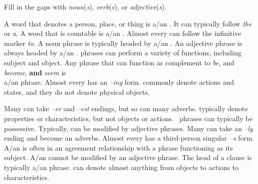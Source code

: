 \begin{tcolorbox}[title=Summary and review, colback=white]
    Fill in the gaps with \textit{noun}(\textit{s}), \textit{verb}(\textit{s}), or \textit{adjective}(\textit{s}).

    \phantom{a}

    \phantom{zzz}A word that denotes a person, place, or thing is a/an \uline{\hspace{1.5cm}}.
    \uline{\hspace{1.5cm}} It can typically follow \textit{the} or \textit{a}. A word that is countable is a/an \uline{\hspace{2cm}}.
    Almost every \uline{\hspace{2cm}} can follow the infinitive marker \textit{to}.
    A noun phrase is typically headed by a/an \uline{\hspace{2cm}}.
    An adjective phrase is always headed by a/an \uline{\hspace{2cm}}.
    \uline{\hspace{2cm}} phrases can perform a variety of functions, including subject and object. Any phrase that can function as complement to \textit{be}, and \textit{become}, \textbf{and} \textit{seem} is \\a/an \uline{\hspace{2cm}} phrase. Almost every \uline{\hspace{2cm}} has an \textit{--ing} form.
    \uline{\hspace{2cm}} commonly denote actions and states, and they do not denote physical objects.

    \phantom{zzz}Many \uline{\hspace{2cm}} can take \textit{--er} and \textit{--est} endings, but so can many adverbs.
    \uline{\hspace{2cm}} typically denote properties or characteristics, but not objects or actions.
    \uline{\hspace{1.4cm}}~phrases can typically be possessive. Typically,
    \uline{\hspace{2cm}} can be modified by adjective phrases. Many \uline{\hspace{2cm}} can take an \textit{--ly} ending and become an adverbs. Almost every \uline{\hspace{2cm}} has a third-person singular \textit{--s} form. A/an \uline{\hspace{2cm}} is often in an agreement relationship with a phrase functioning as its subject. A/an \uline{\hspace{2cm}} cannot be modified by an adjective phrase. The head of a clause is typically a/an \uline{\hspace{2cm}} phrase.
    \uline{\hspace{2cm}} can denote almost anything from objects to actions to characteristics.


\end{tcolorbox}
